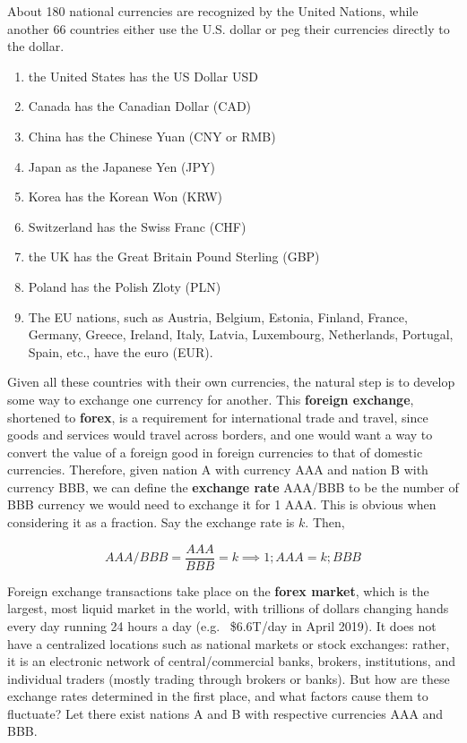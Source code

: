 \documentclass{article}
\begin{document}
    About 180 national currencies are recognized by the United Nations, while another 66 countries either use the U.S. dollar or peg their currencies directly to the dollar.

    \begin{enumerate}
      \item the United States has the US Dollar USD
      \item Canada has the Canadian Dollar (CAD)
      \item China has the Chinese Yuan (CNY or RMB)
      \item Japan as the Japanese Yen (JPY)
      \item Korea has the Korean Won (KRW)
      \item Switzerland has the Swiss Franc (CHF)
      \item the UK has the Great Britain Pound Sterling (GBP)
      \item Poland has the Polish Zloty (PLN)
      \item The EU nations, such as Austria, Belgium, Estonia, Finland, France, Germany, Greece, Ireland, Italy, Latvia, Luxembourg, Netherlands, Portugal, Spain, etc., have the euro (EUR).
    \end{enumerate}

    Given all these countries with their own currencies, the natural step is to develop some way to exchange one currency for another. This \textbf{foreign exchange}, shortened to \textbf{forex}, is a requirement for international trade and travel, since goods and services would travel across borders, and one would want a way to convert the value of a foreign good in foreign currencies to that of domestic currencies. Therefore, given nation A with currency AAA and nation B with currency BBB, we can define the \textbf{exchange rate} AAA/BBB to be the number of BBB currency we would need to exchange it for 1 AAA. This is obvious when considering it as a fraction. Say the exchange rate is $k$. Then,

    \begin{equation}
      AAA/BBB = \frac{AAA}{BBB} = k \implies 1 ; AAA = k ; BBB
    \end{equation}

    Foreign exchange transactions take place on the \textbf{forex market}, which is the largest, most liquid market in the world, with trillions of dollars changing hands every day running 24 hours a day (e.g. ~\$6.6T/day in April 2019). It does not have a centralized locations such as national markets or stock exchanges: rather, it is an electronic network of central/commercial banks, brokers, institutions, and individual traders (mostly trading through brokers or banks).
    But how are these exchange rates determined in the first place, and what factors cause them to fluctuate? Let there exist nations A and B with respective currencies AAA and BBB.
\end{document}
